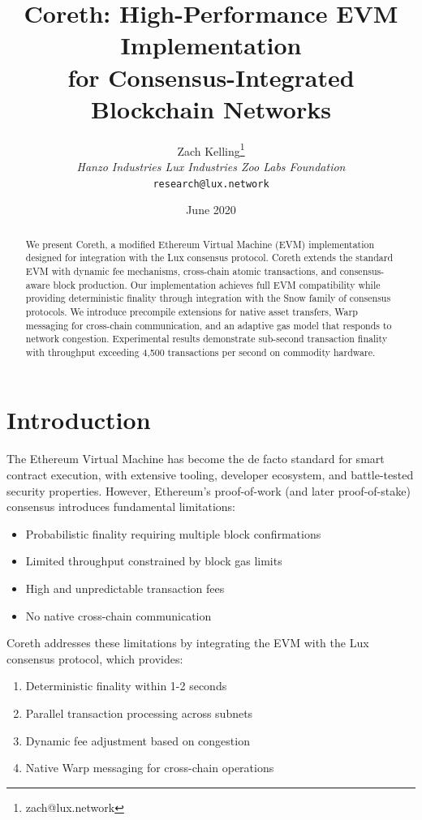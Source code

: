 \documentclass[11pt,letterpaper]{article}
\title{Coreth: High-Performance EVM Implementation\\for Consensus-Integrated Blockchain Networks}
\author{Zach Kelling\thanks{zach@lux.network} \\ \textit{Hanzo Industries \quad Lux Industries \quad Zoo Labs Foundation} \\ \texttt{research@lux.network}}
\date{June 2020}
\begin{document}
\maketitle

\begin{abstract}
We present Coreth, a modified Ethereum Virtual Machine (EVM) implementation designed for integration with the Lux consensus protocol. Coreth extends the standard EVM with dynamic fee mechanisms, cross-chain atomic transactions, and consensus-aware block production. Our implementation achieves full EVM compatibility while providing deterministic finality through integration with the Snow family of consensus protocols. We introduce precompile extensions for native asset transfers, Warp messaging for cross-chain communication, and an adaptive gas model that responds to network congestion. Experimental results demonstrate sub-second transaction finality with throughput exceeding 4,500 transactions per second on commodity hardware.
\end{abstract}

\section{Introduction}

The Ethereum Virtual Machine has become the de facto standard for smart contract execution, with extensive tooling, developer ecosystem, and battle-tested security properties. However, Ethereum's proof-of-work (and later proof-of-stake) consensus introduces fundamental limitations:

\begin{itemize}
    \item Probabilistic finality requiring multiple block confirmations
    \item Limited throughput constrained by block gas limits
    \item High and unpredictable transaction fees
    \item No native cross-chain communication
\end{itemize}

Coreth addresses these limitations by integrating the EVM with the Lux consensus protocol, which provides:

\begin{enumerate}
    \item Deterministic finality within 1-2 seconds
    \item Parallel transaction processing across subnets
    \item Dynamic fee adjustment based on congestion
    \item Native Warp messaging for cross-chain operations
\end{enumerate}
\end{document}
